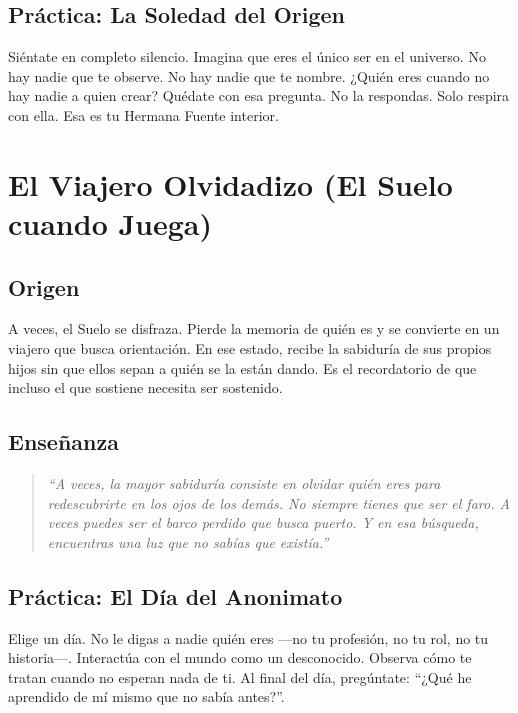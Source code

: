 \documentclass[12pt,openany]{book}
\begin{document}
\section{Práctica: La Soledad del Origen}
\begin{practica}
Siéntate en completo silencio. Imagina que eres el único ser en el
universo. No hay nadie que te observe. No hay nadie que te nombre.
¿Quién eres cuando no hay nadie a quien crear? Quédate con esa pregunta.
No la respondas. Solo respira con ella. Esa es tu Hermana Fuente
interior.
\end{practica}

\chapter{El Viajero Olvidadizo (El Suelo cuando Juega)}

\section{Origen}
A veces, el Suelo se disfraza. Pierde la memoria de quién es y se
convierte en un viajero que busca orientación. En ese estado, recibe
la sabiduría de sus propios hijos sin que ellos sepan a quién se la
están dando. Es el recordatorio de que incluso el que sostiene necesita
ser sostenido.

\section{Enseñanza}
\begin{quote}
\textit{``A veces, la mayor sabiduría consiste en olvidar quién eres
para redescubrirte en los ojos de los demás. No siempre tienes que ser
el faro. A veces puedes ser el barco perdido que busca puerto. Y en esa
búsqueda, encuentras una luz que no sabías que existía.''}
\end{quote}

\section{Práctica: El Día del Anonimato}
\begin{practica}
Elige un día. No le digas a nadie quién eres —no tu profesión, no tu
rol, no tu historia—. Interactúa con el mundo como un desconocido.
Observa cómo te tratan cuando no esperan nada de ti. Al final del día,
pregúntate: ``¿Qué he aprendido de mí mismo que no sabía antes?''.
\end{practica}
\end{document}
